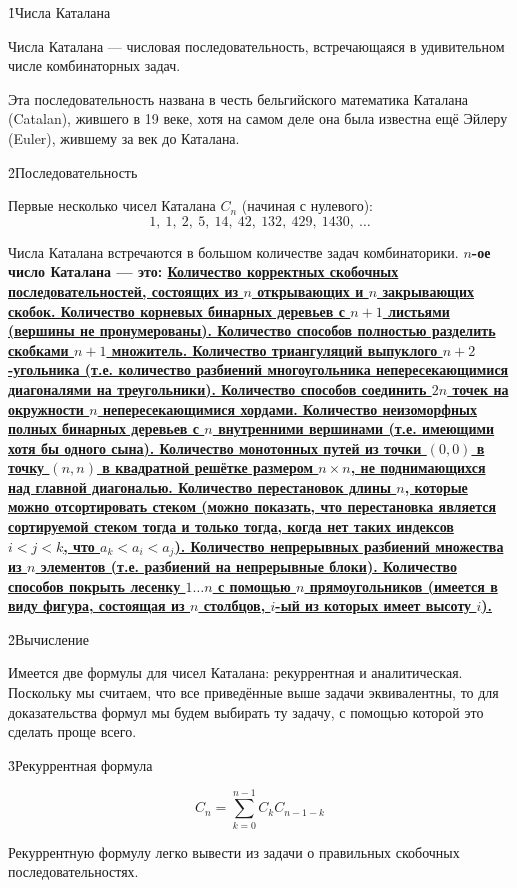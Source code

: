 \h1{Числа Каталана}

Числа Каталана --- числовая последовательность, встречающаяся в удивительном числе комбинаторных задач.

Эта последовательность названа в честь бельгийского математика Каталана (Catalan), жившего в 19 веке, хотя на самом деле она была известна ещё Эйлеру (Euler), жившему за век до Каталана.

\h2{Последовательность}

Первые несколько чисел Каталана $C_n$ (начиная с нулевого):
$$ 1,\ 1,\ 2,\ 5,\ 14,\ 42,\ 132,\ 429,\ 1430,\ \ldots $$

Числа Каталана встречаются в большом количестве задач комбинаторики. \bf{$n$-ое число Каталана} --- это:
\ul{
\li Количество корректных скобочных последовательностей, состоящих из $n$ открывающих и $n$ закрывающих скобок.
\li Количество корневых бинарных деревьев с $n+1$ листьями (вершины не пронумерованы).
\li Количество способов полностью разделить скобками $n+1$ множитель.
\li Количество триангуляций выпуклого $n+2$-угольника (т.е. количество разбиений многоугольника непересекающимися диагоналями на треугольники).
\li Количество способов соединить $2n$ точек на окружности $n$ непересекающимися хордами.
\li Количество неизоморфных полных бинарных деревьев с $n$ внутренними вершинами (т.е. имеющими хотя бы одного сына).
\li Количество монотонных путей из точки $(0,0)$ в точку $(n,n)$ в квадратной решётке размером $n \times n$, не поднимающихся над главной диагональю.
\li Количество перестановок длины $n$, которые можно отсортировать стеком (можно показать, что перестановка является сортируемой стеком тогда и только тогда, когда нет таких индексов $i<j<k$, что $a_k<a_i<a_j$).
\li Количество непрерывных разбиений множества из $n$ элементов (т.е. разбиений на непрерывные блоки).
\li Количество способов покрыть лесенку $1 \ldots n$ с помощью $n$ прямоугольников (имеется в виду фигура, состоящая из $n$ столбцов, $i$-ый из которых имеет высоту $i$).
}

\h2{Вычисление}

Имеется две формулы для чисел Каталана: рекуррентная и аналитическая. Поскольку мы считаем, что все приведённые выше задачи эквивалентны, то для доказательства формул мы будем выбирать ту задачу, с помощью которой это сделать проще всего.

\h3{Рекуррентная формула}

$$ C_n = \sum_{k=0}^{n-1} C_k C_{n-1-k} $$

Рекуррентную формулу легко вывести из задачи о правильных скобочных последовательностях.

